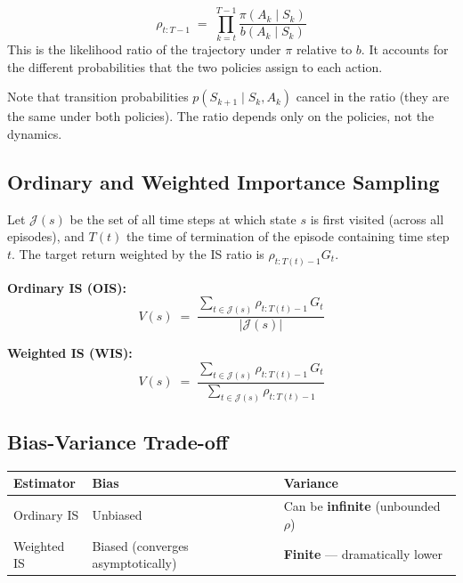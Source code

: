 \documentclass[11pt,a4paper]{article}
\theoremstyle{definition}
\theoremstyle{plain}
\theoremstyle{remark}
\begin{document}
\begin{tcolorbox}[colback=blue!5!white, colframe=blue!60!black, title={Importance Sampling Ratio}]
\[
    \rho_{t:T-1} \;=\; \prod_{k=t}^{T-1} \frac{\pi(A_k \mid S_k)}{b(A_k \mid S_k)}
\]
This is the likelihood ratio of the trajectory under $\pi$ relative to $b$. It accounts for the different probabilities that the two policies assign to each action.
\end{tcolorbox}

Note that transition probabilities $p(S_{k+1} \mid S_k, A_k)$ cancel in the ratio (they are the same under both policies). The ratio depends only on the policies, not the dynamics.

\subsection{Ordinary and Weighted Importance Sampling}

Let $\mathcal{J}(s)$ be the set of all time steps at which state $s$ is first visited (across all episodes), and $T(t)$ the time of termination of the episode containing time step $t$. The target return weighted by the IS ratio is $\rho_{t:T(t)-1} G_t$.

\begin{tcolorbox}[colback=blue!5!white, colframe=blue!60!black, title={Ordinary vs Weighted Importance Sampling}]
\textbf{Ordinary IS (OIS):}
\[
    V(s) \;=\; \frac{\displaystyle\sum_{t \in \mathcal{J}(s)} \rho_{t:T(t)-1}\, G_t}{|\mathcal{J}(s)|}
\]

\textbf{Weighted IS (WIS):}
\[
    V(s) \;=\; \frac{\displaystyle\sum_{t \in \mathcal{J}(s)} \rho_{t:T(t)-1}\, G_t}{\displaystyle\sum_{t \in \mathcal{J}(s)} \rho_{t:T(t)-1}}
\]
\end{tcolorbox}

\subsection{Bias-Variance Trade-off}

\begin{center}
\begin{tabular}{lll}
\hline
\textbf{Estimator} & \textbf{Bias} & \textbf{Variance} \\
\hline
Ordinary IS & Unbiased & Can be \textbf{infinite} (unbounded $\rho$) \\
Weighted IS & Biased (converges asymptotically) & \textbf{Finite} — dramatically lower \\
\hline
\end{tabular}
\end{center}
\end{document}
